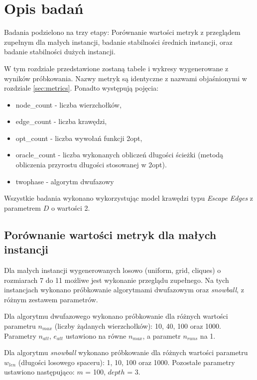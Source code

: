 \section{Opis badań}

Badania podzielono na trzy etapy: Porównanie wartości metryk z przeglądem zupełnym dla małych instancji,
badanie stabilności średnich instancji, oraz badanie stabilności dużych instancji.

W tym rozdziale przedstawione zostaną tabele i wykresy wygenerowane z wyników próbkowania.
Nazwy metryk są identyczne z nazwami objaśnionymi w rozdziale \ref{sec:metrics}.
Ponadto występują pojęcia:

\begin{itemize}
    \item node\_count - liczba wierzchołków,
    \item edge\_count - liczba krawędzi,
    \item opt\_count - liczba wywołań funkcji 2opt,
    \item oracle\_count - liczba wykonanych obliczeń długości ścieżki (metodą obliczenia przyrostu długości stosowanej w 2opt).
    \item twophase - algorytm dwufazowy
\end{itemize}

Wszystkie badania wykonano wykorzystując model krawędzi typu \textit{Escape Edges} z parametrem $D$ o wartości 2.

\subsection{Porównanie wartości metryk dla małych instancji}
Dla małych instancji wygenerowanych losowo (uniform, grid, cliques) o rozmiarach 7 do 11
możliwe jest wykonanie przeglądu zupełnego.
Na tych instancjach wykonano próbkowanie algorytmami dwufazowym oraz \textit{snowball}, z różnym zestawem parametrów.

Dla algorytmu dwufazowego wykonano próbkowanie dla różnych wartości parametru $n_{max}$ (liczby żądanych wierzchołków): 10, 40, 100 oraz 1000.
Parametry $n_{att}$, $e_{att}$ ustawiono na równe $n_{max}$, a parametr $n_{runs}$ na 1.

Dla algorytmu \textit{snowball} wykonano próbkowanie dla różnych wartości parametru $w_{len}$ (długości losowego spaceru): 1, 10, 100 oraz 1000.
Pozostałe parametry ustawiono następująco: $m$ = 100, $depth$ = 3.

